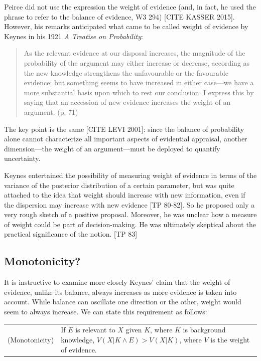 \documentclass[
  10pt,
  dvipsnames,enabledeprecatedfontcommands]{scrartcl}
\begin{document}
Peirce did not use the expression the weight of evidence (and, in fact,
he used the phrase to refer to the balance of evidence, W3 294) {[}CITE
KASSER 2015{]}. However, his remarks anticipated what came to be called
weight of evidence by Keynes in his 1921
\emph{A Treatise on Probability}:

\begin{quote}
As the relevant evidence at our disposal increases, the magnitude of the
probability of the argument may either increase or decrease, according as the new knowledge strengthens the unfavourable or the favourable evidence; but something seems to have increased in either case---we have a more substantial basis upon which to rest our conclusion. I express this by saying that an accession of new evidence increases the weight of an argument. (p. 71)
\end{quote}

\noindent The key point is the same {[}CITE LEVI 2001{]}: since the
balance of probability alone cannot characterize all important aspects
of evidential appraisal, another dimension---the weight of an
argument---must be deployed to quantify uncertainty.

Keynes entertained the possibility of measuring weight of evidence in
terms of the variance of the posterior distribution of a certain
parameter, but was quite attached to the idea that weight should
increase with new information, even if the dispersion may increase with
new evidence {[}TP 80-82{]}. So he proposed only a very rough sketch of
a positive proposal. Moreover, he was unclear how a measure of weight
could be part of decision-making. He was ultimately skeptical about the
practical significance of the notion. {[}TP 83{]}

\hypertarget{monotonicity}{%
\subsection{Monotonicity?}\label{monotonicity}}

It is instructive to examine more closely Keynes' claim that the weight
of evidence, unlike its balance, always increases as more evidence is
taken into account. While balance can oscillate one direction or the
other, weight would seem to always increase. We can state this
requirement as follows:

\begin{tabular}{lp{11cm}}
(Monotonicity) & If $E$ is relevant to $X$ given $K$, where $K$ is background knowledge, $V(X\vert K \wedge E) > V(X\vert K)$, where $V$ is the weight of evidence.
\end{tabular}
\end{document}
